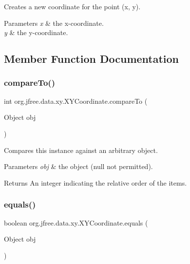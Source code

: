 Creates a new coordinate for the point (x, y).


\begin{DoxyParams}{Parameters}
{\em x} & the x-\/coordinate. \\
\hline
{\em y} & the y-\/coordinate. \\
\hline
\end{DoxyParams}


\subsection{Member Function Documentation}
\mbox{\label{classorg_1_1jfree_1_1data_1_1xy_1_1_x_y_coordinate_a9335533eead72698a743996d29a03f02}} 
\subsubsection{\texorpdfstring{compare\+To()}{compareTo()}}
{\footnotesize\ttfamily int org.\+jfree.\+data.\+xy.\+X\+Y\+Coordinate.\+compare\+To (\begin{DoxyParamCaption}\item[{Object}]{obj }\end{DoxyParamCaption})}

Compares this instance against an arbitrary object.


\begin{DoxyParams}{Parameters}
{\em obj} & the object ({\ttfamily null} not permitted).\\
\hline
\end{DoxyParams}
\begin{DoxyReturn}{Returns}
An integer indicating the relative order of the items. 
\end{DoxyReturn}
\mbox{\label{classorg_1_1jfree_1_1data_1_1xy_1_1_x_y_coordinate_aa9d11342c194c969e3f581efff41079f}} 
\subsubsection{\texorpdfstring{equals()}{equals()}}
{\footnotesize\ttfamily boolean org.\+jfree.\+data.\+xy.\+X\+Y\+Coordinate.\+equals (\begin{DoxyParamCaption}\item[{Object}]{obj }\end{DoxyParamCaption})}


